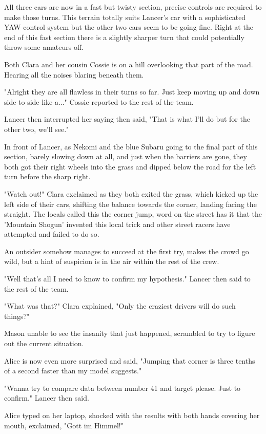 All three cars are now in a fast but twisty section, precise controls are required to make those turns. 
This terrain totally suits Lancer's car with a sophisticated YAW control system but the other two cars seem to be going fine. 
Right at the end of this fast section there is a slightly sharper turn that could potentially throw some amateurs off.

Both Clara and her cousin Cossie is on a hill overlooking that part of the road. Hearing all the noises blaring beneath them.

"Alright they are all flawless in their turns so far. Just keep moving up and down side to side like a..." Cossie reported to the rest of the team.

Lancer then interrupted her saying then said, "That is what I'll do but for the other two, we'll see."

In front of Lancer, as Nekomi and the blue Subaru going to the final part of this section, barely slowing down at all, and just when the barriers are gone, they both got their right wheels into the grass and dipped below the road for the left turn before the sharp right.

"Watch out!" Clara exclaimed as they both exited the grass, which kicked up the left side of their cars, shifting the balance towards the corner, landing facing the straight. 
The locals called this the corner jump, word on the street has it that the 'Mountain Shogun' invented this local trick and other street racers have attempted and failed to do so.

An outsider somehow manages to succeed at the first try, makes the crowd go wild, but a hint of suspicion is in the air within the rest of the crew.

"Well that's all I need to know to confirm my hypothesis." Lancer then said to the rest of the team.

"What was that?" Clara explained, "Only the craziest drivers will do such things?"

Mason unable to see the insanity that just happened, scrambled to try to figure out the current situation.

Alice is now even more surprised and said, "Jumping that corner is three tenths of a second faster than my model suggests."

"Wanna try to compare data between number 41 and target please. Just to confirm." Lancer then said.

Alice typed on her laptop, shocked with the results with both hands covering her mouth, exclaimed, "Gott im Himmel!"


